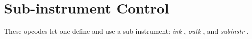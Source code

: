 \begin{comment}
\documentclass[10pt]{article}
\usepackage{fullpage, graphicx, url}
\setlength{\parskip}{1ex}
\setlength{\parindent}{0ex}
\title{Sub-instrument Control}



\begin{tabular}{ccc}
The Alternative Csound Reference Manual & & \\
Previous &Instrument Control &Next

\end{tabular}

\end{comment}
\section{Sub-instrument Control}


  These opcodes let one define and use a sub-instrument: \emph{ink}
, \emph{outk}
, and \emph{subinstr}
. 


\begin{comment}
\begin{tabular}{lcr}
Previous &Home &Next \\
Sensing and Control &Up &Time Reading

\end{tabular}



\end{comment}
